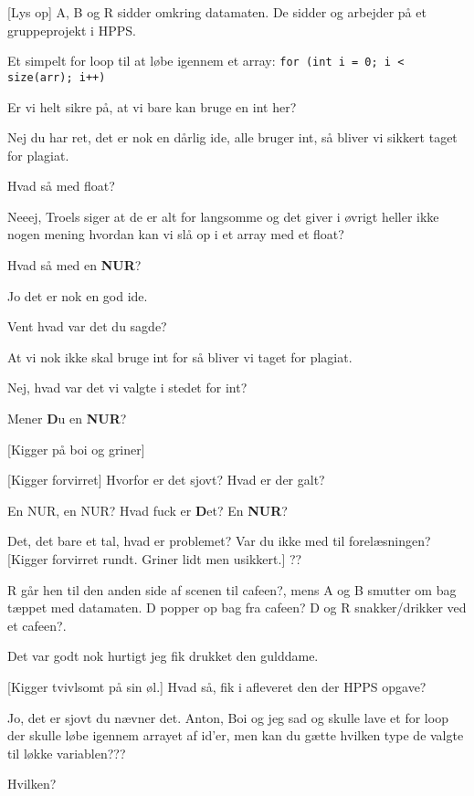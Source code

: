 \documentclass{article}
\begin{document}
\newpage%
\begin{sketch}
\scene{}
[Lys op] A, B og R sidder omkring datamaten. De sidder og arbejder på et gruppeprojekt i HPPS.

 Et simpelt for loop til at løbe igennem et array: \verb|for (int i = 0; i < size(arr); i++)|

Er vi helt sikre på, at vi bare kan bruge en int her?

Nej du har ret, det er nok en dårlig ide, alle bruger int, så bliver vi sikkert taget for plagiat.


 Hvad så med float?

Neeej, Troels siger at de er alt for langsomme og det giver i øvrigt heller ikke nogen mening hvordan kan vi slå op i et array med et float?

Hvad så med en \textbf{NUR}?

Jo det er nok en god ide.

Vent hvad var det du sagde?

At vi nok ikke skal bruge int for så bliver vi taget for plagiat.

Nej, hvad var det vi valgte i stedet for int?

Mener \textbf{D}u en \textbf{NUR}?

[Kigger på boi og griner]

[Kigger forvirret]
Hvorfor er det sjovt? Hvad er der galt?

En NUR, en NUR? Hvad fuck er \textbf{D}et? En \textbf{NUR}?

Det, det bare et tal, hvad er problemet?
Var du ikke med til forelæsningen?
[Kigger forvirret rundt. Griner lidt men usikkert.] ??


\scene{}
R går hen til den anden side af scenen til cafeen?, mens A og B smutter om bag tæppet med datamaten.
D popper op bag fra cafeen? D og R snakker/drikker ved et cafeen?.

Det var godt nok hurtigt jeg fik drukket den gulddame.

[Kigger tvivlsomt på sin øl.] Hvad så, fik i afleveret den der HPPS opgave?

Jo, det er sjovt du nævner det. Anton, Boi og jeg sad og skulle lave et for loop der skulle løbe igennem arrayet af id’er, men kan du gætte hvilken type de valgte til løkke variablen???

Hvilken?


\end{sketch}
\end{document}
